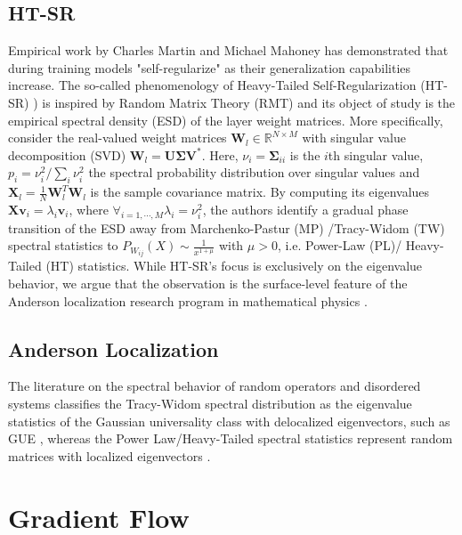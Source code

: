 \documentclass{article}
\theoremstyle{plain}
\numberwithin{equation}{section}
\theoremstyle{definition}
\theoremstyle{remark}
\begin{document}
\subsection{HT-SR}
\label{appendix:martin_and_mahoney}
 Empirical work by Charles Martin and Michael Mahoney has demonstrated that during training models "self-regularize" as their generalization capabilities increase. The so-called phenomenology of Heavy-Tailed Self-Regularization (HT-SR) \cite{htsr1, htsr2, htsr3}) is inspired by Random Matrix Theory (RMT) and its object of study is the empirical spectral density (ESD) of the layer weight matrices. More specifically, consider the real-valued weight matrices $\mathbf{W}_l\in \mathbb{R}^{N\times M}$  with singular value decomposition (SVD) $\mathbf{W}_l = \mathbf{U}\mathbf{\Sigma}\mathbf{V}^*$. Here, $\nu_i = \mathbf{\Sigma}_{ii}$ is the $i$th singular value, $p_i = \nu_i^2/\sum_i \nu_i^2$ the spectral probability distribution over singular values and $\mathbf{X}_l = \frac{1}{N}\mathbf{W}_l^T\mathbf{W}_l$ is the sample covariance matrix. By computing its eigenvalues $\mathbf{X}\mathbf{v}_i =\lambda_i\mathbf{v}_i$, where $\forall_{i=1, \cdots, M}\lambda_i = \nu_i^2$, the authors identify a gradual phase transition of the ESD away from Marchenko-Pastur (MP) /Tracy-Widom (TW) spectral statistics to $P_{W_{ij}}(X)\sim \frac{1}{x^{1+\mu}}$ with $\mu>0$, i.e. Power-Law (PL)/ Heavy-Tailed (HT) statistics.  While HT-SR's focus is exclusively on the eigenvalue behavior, we argue that the observation is the surface-level feature of the Anderson localization research program in mathematical physics \cite{anderson}.
\subsection{Anderson Localization}
\label{sec:anderson_localization}
\noindent The literature on the spectral behavior of random operators and disordered systems classifies the Tracy-Widom spectral distribution as the eigenvalue statistics of the Gaussian universality class with delocalized eigenvectors, such as GUE \cite{taoRMT}, whereas the Power Law/Heavy-Tailed spectral statistics represent random matrices with localized eigenvectors \cite{aizenman1993, mirlin1996, thouless}.


\section{Gradient Flow}
\end{document}
